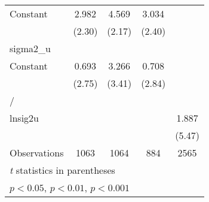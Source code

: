 {\begin{longtable}{l*{4}{c}}
Constant        &    2.982\sym{*}  &    4.569\sym{*}  &    3.034\sym{*}  &                  \\
                &   (2.30)         &   (2.17)         &   (2.40)         &                  \\
\hline
sigma2\_u        &                  &                  &                  &                  \\
Constant        &    0.693\sym{**} &    3.266\sym{***}&    0.708\sym{**} &                  \\
                &   (2.75)         &   (3.41)         &   (2.84)         &                  \\
\hline
/               &                  &                  &                  &                  \\
lnsig2u         &                  &                  &                  &    1.887\sym{***}\\
                &                  &                  &                  &   (5.47)         \\
\hline
Observations    &     1063         &     1064         &      884         &     2565         \\
\hline\hline
\multicolumn{5}{l}{\footnotesize \textit{t} statistics in parentheses}\\
\multicolumn{5}{l}{\footnotesize \sym{*} \(p<0.05\), \sym{**} \(p<0.01\), \sym{***} \(p<0.001\)}\\
\end{longtable}
}
